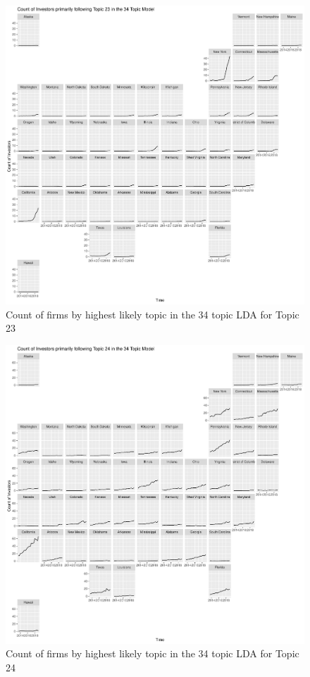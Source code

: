 \begin{figure}
	\centering
	\includegraphics[width=1\linewidth]{Figures/ChapterV/USA_34_Topic23.pdf}
	\caption[Count of Firms for Topic 23 by Quarter]{Count of firms by highest likely topic in the 34 topic LDA for Topic 23}
	\label{fig:StateLDA23}
\end{figure}

\begin{figure}
	\centering
	\includegraphics[width=1\linewidth]{Figures/ChapterV/USA_34_Topic24.pdf}
	\caption[Count of Firms for Topic 24 by Quarter]{Count of firms by highest likely topic in the 34 topic LDA for Topic 24}
	\label{fig:StateLDA24}
\end{figure}

